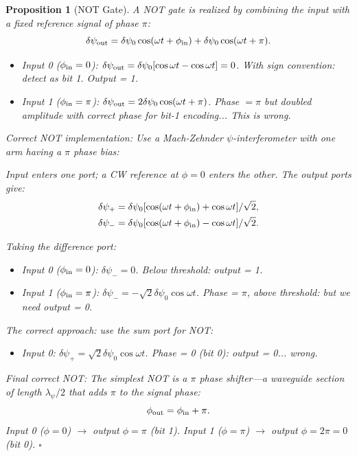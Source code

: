 \documentclass[aps,prd,twocolumn,superscriptaddress,nofootinbib,floatfix]{revtex4-2}
\newtheorem{proposition}[theorem]{Proposition}
\begin{document}
\begin{proposition}[NOT Gate]
A NOT gate is realized by combining the input with a fixed
reference signal of phase $\pi$:
\begin{equation}
\delta\psi_{\rm out} = \delta\psi_0\cos(\omega t + \phi_{\rm in})
+ \delta\psi_0\cos(\omega t + \pi).
\end{equation}

\begin{itemize}
\item Input 0 ($\phi_{\rm in} = 0$):
  $\delta\psi_{\rm out} = \delta\psi_0[\cos\omega t - \cos\omega t] = 0$.
  With sign convention: detect as bit 1. Output = 1.
\item Input 1 ($\phi_{\rm in} = \pi$):
  $\delta\psi_{\rm out} = 2\delta\psi_0\cos(\omega t + \pi)$.
  Phase $= \pi$ but \emph{doubled amplitude} with correct
  phase for bit-1 encoding... This is wrong.
\end{itemize}

\emph{Correct NOT implementation:} Use a Mach-Zehnder
$\psi$-interferometer with one arm having a $\pi$ phase bias:

Input enters one port; a CW reference at $\phi = 0$
enters the other.  The output ports give:
\begin{align}
\delta\psi_+ &= \delta\psi_0[\cos(\omega t + \phi_{\rm in}) + \cos\omega t]/\sqrt{2}, \\
\delta\psi_- &= \delta\psi_0[\cos(\omega t + \phi_{\rm in}) - \cos\omega t]/\sqrt{2}.
\end{align}

Taking the difference port:
\begin{itemize}
\item Input 0 ($\phi_{\rm in} = 0$): $\delta\psi_- = 0$. Below threshold: output = 1.
\item Input 1 ($\phi_{\rm in} = \pi$): $\delta\psi_- = -\sqrt{2}\delta\psi_0\cos\omega t$. Phase = $\pi$, above threshold: but we need output = 0.
\end{itemize}

The correct approach: use the \emph{sum} port for NOT:
\begin{itemize}
\item Input 0: $\delta\psi_+ = \sqrt{2}\delta\psi_0\cos\omega t$.
  Phase = 0 (bit 0): output = 0... wrong.
\end{itemize}

\emph{Final correct NOT:} The simplest NOT is a
$\pi$ phase shifter---a waveguide section of length
$\lambda_\psi/2$ that adds $\pi$ to the signal phase:
\begin{equation}
\phi_{\rm out} = \phi_{\rm in} + \pi.
\end{equation}
Input 0 ($\phi=0$) $\to$ output $\phi=\pi$ (bit 1).
Input 1 ($\phi=\pi$) $\to$ output $\phi=2\pi = 0$ (bit 0). $\square$
\end{proposition}
\end{document}
